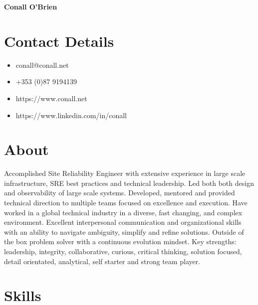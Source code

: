 \documentclass[a4paper, 10pt] {article}
\begin{document}
\begingroup
  \centering
  \LARGE \textbf{Conall O'Brien}\\[1.5em]
\endgroup

\hrulefill

\section*{Contact Details}

\begin{multicols}{2}

  \begin{itemize}
    \item conall@conall.net
    \item +353 (0)87 9194139
    \item https://www.conall.net
    \item https://www.linkedin.com/in/conall
  \end{itemize}

\end{multicols}

\hrulefill

\section*{About}

Accomplished Site Reliability Engineer with extensive experience in
large scale infrastructure, SRE best practices and technical leadership.
Led both both design and observability of large scale systems.
Developed, mentored and provided technical direction to multiple teams
focused on excellence and execution. Have worked in a global technical
industry in a diverse, fast changing, and complex environment. Excellent
interpersonal communication and organizational skills with an ability to
navigate ambiguity, simplify and refine solutions. Outside of the box
problem solver with a continuous evolution mindset. Key strengths:
leadership, integrity, collaborative, curious, critical thinking, solution
focused, detail orientated, analytical, self starter and strong team player.

\section*{Skills}
\end{document}
